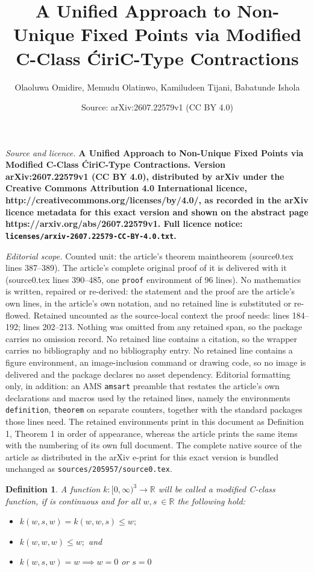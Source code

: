 \documentclass[10pt,a4paper]{amsart}
\title{\bf{A Unified Approach to Non-Unique Fixed Points via Modified C-Class ĆiriC-Type Contractions}}
\author{Olaoluwa Omidire, Memudu Olatinwo, Kamiludeen Tijani, Babatunde Ishola}
\date{Source: arXiv:2607.22579v1 (CC BY 4.0)}
\newtheorem{definition}{Definition}
\begin{document}
\maketitle

\noindent\emph{Source and licence.} \bf{A Unified Approach to Non-Unique Fixed Points via Modified C-Class ĆiriC-Type Contractions}. Version arXiv:2607.22579v1 (CC BY 4.0), distributed by arXiv under the Creative Commons Attribution 4.0 International licence, http://creativecommons.org/licenses/by/4.0/, as recorded in the arXiv licence metadata for this exact version and shown on the abstract page https://arxiv.org/abs/2607.22579v1. Full licence notice: \texttt{licenses/arxiv-2607.22579-CC-BY-4.0.txt}.\par\smallskip

\noindent\textit{Editorial scope.} Counted unit: the article's theorem maintheorem (source0.tex lines 387--389). The article's complete original proof of it is delivered with it (source0.tex lines 390--485, one \texttt{proof} environment of 96 lines). No mathematics is written, repaired or re-derived: the statement and the proof are the article's own lines, in the article's own notation, and no retained line is substituted or re-flowed.  Retained uncounted as the source-local context the proof needs: lines 184--192; lines 202--213.  Nothing was omitted from any retained span, so the package carries no omission record.  No retained line contains a citation, so the wrapper carries no bibliography and no bibliography entry.  No retained line contains a figure environment, an image-inclusion command or drawing code, so no image is delivered and the package declares no asset dependency.  Editorial formatting only, in addition: an AMS \texttt{amsart} preamble that restates the article's own declarations and macros used by the retained lines, namely the environments \texttt{definition}, \texttt{theorem} on separate counters, together with the standard packages those lines need.  The retained environments print in this document as Definition 1, Theorem 1 in order of appearance, whereas the article prints the same items with the numbering of its own full document.  The complete native source of the article as distributed in the arXiv e-print for this exact version is bundled unchanged as \texttt{sources/205957/source0.tex}.
	\begin{definition}\label{defn1}
		A function $k:[0, \infty)^3 \to \mathbb{R}$ will be called a modified C-class function, if is continuous and for all $w, s~\in \mathbb{R} $  the following hold:\\
		\begin{itemize}
			\item $k(w,s,w) = k(w,w,s) \leq w;$
			\item  $k(w,w,w)\leq w;$ and
			\item $k(w,s,w)=w \implies w=0$ or $s=0$
			
		\end{itemize} 
	\end{definition}
\end{document}
